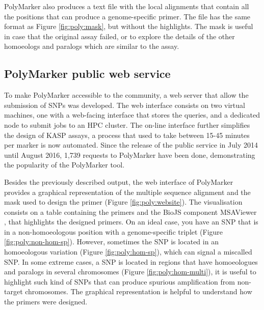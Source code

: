 PolyMarker also produces a text file with the local alignments that contain all the positions that can produce a genome-specific primer. 
The file has the same format as Figure \ref{fig:poly:mask}, but without the highlights. 
The mask is useful in case that the original assay failed, or to explore the details of the other homoeologs and paralogs which are similar to the assay. 

\subsection{PolyMarker public web service}
To make PolyMarker accessible to the community, a web server that allow the submission of SNPs was developed. 
The web interface consists on two virtual machines, one with a web-facing interface that stores the queries, and a dedicated node to submit jobs to an HPC cluster.
The on-line interface further simplifies the design of KASP assays, a process that used to take between 15-45 minutes per marker is now automated. 
Since the release of the public service in July 2014 until August 2016, 1,739 requests to PolyMarker have been done, demonstrating the popularity of the PolyMarker tool. 

Besides the previously described output, the web interface of PolyMarker provides a graphical representation of the multiple sequence alignment and the mask used to design the primer (Figure \ref{fig:poly:website}). 
The visualisation consists on a table containing the primers and the BioJS component MSAViewer \citep{Yachdav2016}, that highlights the designed primers. 
On an ideal case, you have an SNP that is in a non-homoeologous position with a genome-specific triplet (Figure \ref{fig:poly:non-hom-sp}). 
However, sometimes the SNP is located in an homoeologous variation (Figure \ref{fig:poly:hom-sp}), which can signal a miscalled SNP. 
In some extreme cases, a SNP is located in regions that have homoeologues and paralogs in several chromosomes (Figure \ref{fig:poly:hom-multi}), it is useful to highlight such kind of SNPs that can produce spurious amplification from non-target chromosomes. 
The graphical representation is helpful to understand how the primers were designed.

